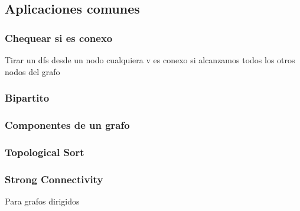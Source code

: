 \newpage
\subsection{Aplicaciones comunes}

\subsubsection{Chequear si es conexo}
Tirar un dfs desde un nodo cualquiera v
es conexo si alcanzamos todos los otros nodos del grafo

\subsubsection{Bipartito}


\subsubsection{Componentes de un grafo}


\subsubsection{Topological Sort}


\newpage
\subsubsection{Strong Connectivity}
Para grafos dirigidos

